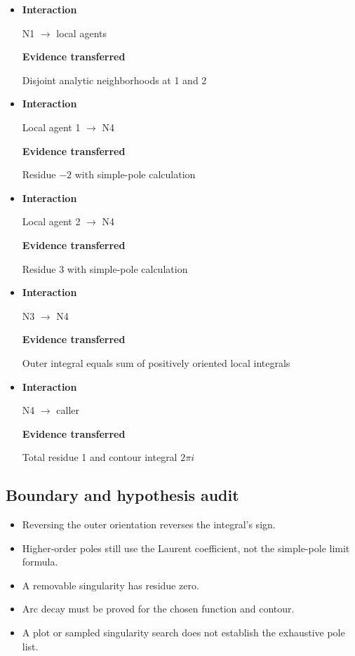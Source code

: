 \documentclass[preprint,12pt,aps,pra,showkeys,amsmath,amssymb,superscriptaddress,floatfix]{revtex4-2}
\theoremstyle{definition}
\theoremstyle{remark}
\providecommand{\tightlist}{\setlength{\itemsep}{2pt}\setlength{\parskip}{0pt}}
\begin{document}
\begin{itemize}
\item
  \textbf{Interaction}

  N1 \(\to\) local agents

  \textbf{Evidence transferred}

  Disjoint analytic neighborhoods at 1 and 2
\item
  \textbf{Interaction}

  Local agent 1 \(\to\) N4

  \textbf{Evidence transferred}

  Residue \(-2\) with simple-pole calculation
\item
  \textbf{Interaction}

  Local agent 2 \(\to\) N4

  \textbf{Evidence transferred}

  Residue 3 with simple-pole calculation
\item
  \textbf{Interaction}

  N3 \(\to\) N4

  \textbf{Evidence transferred}

  Outer integral equals sum of positively oriented local integrals
\item
  \textbf{Interaction}

  N4 \(\to\) caller

  \textbf{Evidence transferred}

  Total residue 1 and contour integral \(2\pi i\)
\end{itemize}

\subsection{Boundary and hypothesis audit}

\begin{itemize}
\tightlist
\item
  Reversing the outer orientation reverses the integral's sign.
\item
  Higher-order poles still use the Laurent coefficient, not the
  simple-pole limit formula.
\item
  A removable singularity has residue zero.
\item
  Arc decay must be proved for the chosen function and contour.
\item
  A plot or sampled singularity search does not establish the exhaustive
  pole list.
\end{itemize}
\end{document}
